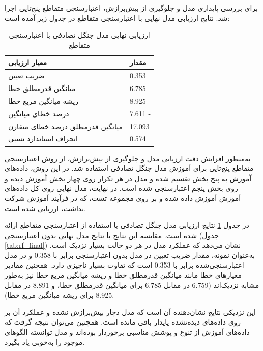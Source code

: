 برای بررسی پایداری مدل و جلوگیری از بیش‌برازش، اعتبارسنجی متقاطع پنج‌تایی اجرا شد. نتایج ارزیابی مدل نهایی با اعتبارسنجی متقاطع در جدول زیر آمده است:

\begin{table}[H]
	\centering
	\caption{ارزیابی نهایی مدل جنگل تصادفی با اعتبارسنجی متقاطع}
	\renewcommand{\arraystretch}{1.3}
	\begin{tabular}{>{\centering\arraybackslash}m{4cm} >{\centering\arraybackslash}m{3cm}}
		\toprule
		\textbf{معیار ارزیابی} & \textbf{مقدار} \\
		\midrule
		ضریب تعیین & \num{0.353} \\
		میانگین قدرمطلق خطا & \num{6.785} \\
		ریشه میانگین مربع خطا & \num{8.925} \\
		درصد خطای میانگین & \num{7.611} - \\
		میانگین قدرمطلق درصد خطای متقارن & \num{17.093} \\
		انحراف استاندارد نسبی & \num{0.574} \\
		\bottomrule
	\end{tabular}
	\label{tab:rf_cv_final}
\end{table}

به‌منظور افزایش دقت ارزیابی مدل و جلوگیری از بیش‌برازش، از روش اعتبارسنجی متقاطع پنج‌تایی برای آموزش مدل جنگل تصادفی استفاده شد. در این روش، داده‌های آموزش به پنج بخش تقسیم شده و مدل در هر تکرار روی چهار بخش آموزش دیده و روی بخش پنجم اعتبارسنجی شده است. در نهایت، مدل نهایی روی کل داده‌های آموزش آموزش داده شده و بر روی مجموعه تست، که در فرآیند آموزش شرکت نداشت، ارزیابی شده است.

در جدول \ref{tab:rf_cv_final} نتایج ارزیابی مدل جنگل تصادفی با استفاده از اعتبارسنجی متقاطع ارائه شده است. مقایسه این نتایج با نتایج مدل نهایی بدون اعتبارسنجی (جدول \ref{tab:rf_final}) نشان می‌دهد که عملکرد مدل در هر دو حالت بسیار نزدیک است. به‌عنوان نمونه، مقدار ضریب تعیین در مدل بدون اعتبارسنجی برابر با \num{0.358} و در مدل اعتبارسنجی‌شده برابر با \num{0.353} است که تفاوت بسیار ناچیزی دارد. همچنین مقادیر معیارهای خطا مانند میانگین قدرمطلق خطا و ریشه میانگین مربع خطا نیز به‌طور مشابه نزدیک‌اند (\num{6.759} در مقابل \num{6.785} برای میانگین قدرمطلق خطا، و \num{8.891} در مقابل \num{8.925} برای ریشه میانگین مربع خطا).

این نزدیکی نتایج نشان‌دهنده آن است که مدل دچار بیش‌برازش نشده و عملکرد آن بر روی داده‌های دیده‌نشده پایدار باقی مانده است. همچنین می‌توان نتیجه گرفت که داده‌های آموزش از تنوع و پوشش مناسبی برخوردار بوده‌اند و مدل توانسته الگوهای موجود را به‌خوبی یاد بگیرد.

